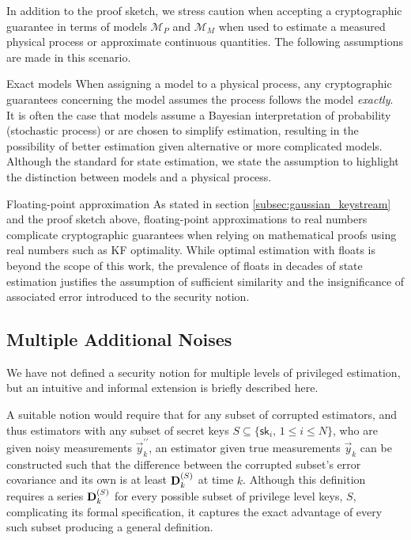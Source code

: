 \documentclass[letterpaper, 10 pt, conference]{IEEEtran}
\theoremstyle{definition}
\begin{document}
In addition to the proof sketch, we stress caution when accepting a cryptographic guarantee in terms of models $\mathcal{M}_P$ and $\mathcal{M}_M$ when used to estimate a measured physical process or approximate continuous quantities. The following assumptions are made in this scenario.
\begin{LaTeXdescription}
   \item[Exact models] When assigning a model to a physical process, any cryptographic guarantees concerning the model assumes the process follows the model \textit{exactly}. It is often the case that models assume a Bayesian interpretation of probability (stochastic process) or are chosen to simplify estimation, resulting in the possibility of better estimation given alternative or more complicated models. Although the standard for state estimation, we state the assumption to highlight the distinction between models and a physical process.
   \item[Floating-point approximation] As stated in section \ref{subsec:gaussian_keystream} and the proof sketch above, floating-point approximations to real numbers complicate cryptographic guarantees when relying on mathematical proofs using real numbers such as KF optimality. While optimal estimation with floats is beyond the scope of this work, the prevalence of floats in decades of state estimation justifies the assumption of sufficient similarity and the insignificance of associated error introduced to the security notion.
\end{LaTeXdescription}

% 
% 

\subsection{Multiple Additional Noises}
We have not defined a security notion for multiple levels of privileged estimation, but an intuitive and informal extension is briefly described here. 

A suitable notion would require that for any subset of corrupted estimators, and thus estimators with any subset of secret keys $S \subseteq \{\mathsf{sk}_i,\,1\leq i\leq N\}$, who are given noisy measurements $\vec{y}_k^{\prime\prime}$, an estimator given true measurements $\vec{y}_k$ can be constructed such that the difference between the corrupted subset's error covariance and its own is at least ${{\mathbf{D}}}^{(S)}_k$ at time $k$. Although this definition requires a series ${{\mathbf{D}}}^{(S)}_k$ for every possible subset of privilege level keys, $S$, complicating its formal specification, it captures the exact advantage of every such subset producing a general definition.
\end{document}
